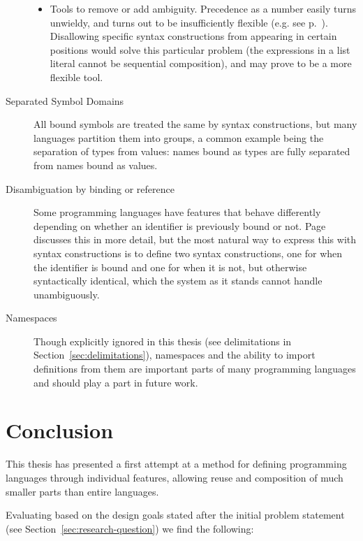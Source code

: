 \documentclass{kththesis}
\begin{document}
\begin{description}
\begin{itemize}
    \item Tools to remove or add ambiguity. Precedence as a number easily turns unwieldy, and turns out to be insufficiently flexible (e.g. see p.~\pageref{sec:ambiguous-lists}). Disallowing specific syntax constructions from appearing in certain positions would solve this particular problem (the expressions in a list literal cannot be sequential composition), and may prove to be a more flexible tool.
  \end{itemize}

  \item[Separated Symbol Domains] All bound symbols are treated the same by syntax constructions, but many languages partition them into groups, a common example being the separation of types from values: names bound as types are fully separated from names bound as values. %

  \item[Disambiguation by binding or reference] Some programming languages have features that behave differently depending on whether an identifier is previously bound or not. Page~\pageref{sec:prolog-pattern-matching} discusses this in more detail, but the most natural way to express this with syntax constructions is to define two syntax constructions, one for when the identifier is bound and one for when it is not, but otherwise syntactically identical, which the system as it stands cannot handle unambiguously.

  \item[Namespaces] Though explicitly ignored in this thesis (see delimitations in Section~\ref{sec:delimitations}), namespaces and the ability to import definitions from them are important parts of many programming languages and should play a part in future work.
\end{description}

\section{Conclusion}

This thesis has presented a first attempt at a method for defining programming languages through individual features, allowing reuse and composition of much smaller parts than entire languages.

Evaluating based on the design goals stated after the initial problem statement (see Section~\ref{sec:research-question}) we find the following:
\end{document}
